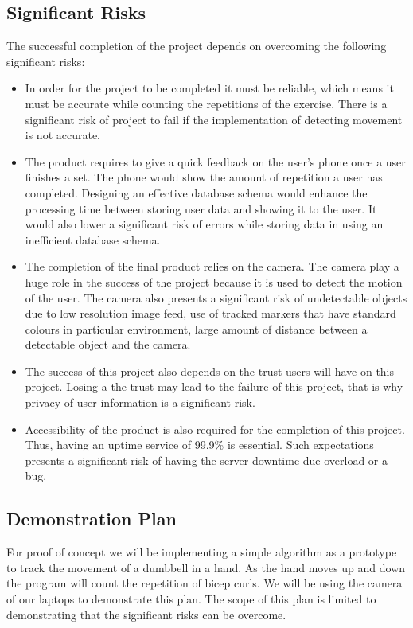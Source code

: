 \subsection{Significant Risks}
The successful completion of the project depends on overcoming the following significant risks:
    \begin{itemize}
        \item In order for the project to be completed it must be reliable, which means it must be accurate while counting the repetitions of the exercise. There is a significant risk of project to fail if the implementation of detecting movement is not accurate.
        \item The product requires to give a quick feedback on the user's phone once a user finishes a set. The phone would show the amount of repetition a user has completed. Designing an effective database schema would enhance the processing time between storing user data and showing it to the user. It would also lower a significant risk of errors while storing data in using an inefficient database schema.
        \item The completion of the final product relies on the camera. The camera play a huge role in the success of the project because it is used to detect the motion of the user. The camera also presents a significant risk of undetectable objects due to low resolution image feed, use of tracked markers that have standard colours in particular environment, large amount of distance between a detectable object and the camera.
        \item The success of this project also depends on the trust users will have on this project. Losing a the trust may lead to the failure of this project, that is why privacy of user information is a significant risk.
        \item Accessibility of the product is also required for the completion of this project. Thus, having an uptime service of 99.9\% is essential. Such expectations presents a significant risk of having the server downtime due overload or a bug.
    \end{itemize}
\subsection{Demonstration Plan}
For proof of concept we will be implementing a simple algorithm as a prototype to track the movement of a dumbbell in a hand. As the hand moves up and down the program will count the repetition of bicep curls. We will be using the camera of our laptops to demonstrate this plan. The scope of this plan is limited to demonstrating that the significant risks can be overcome. 

